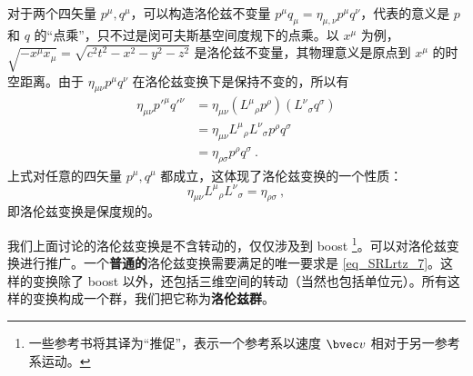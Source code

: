 对于两个四矢量 $p^\mu,q^\mu$，可以构造洛伦兹不变量 $p^\mu q_\mu=\eta_{\mu,\nu}p^\mu q^\nu$，代表的意义是 $p$ 和 $q$ 的“点乘”，只不过是闵可夫斯基空间度规下的点乘。以 $x^\mu$ 为例，$\sqrt{-x^\mu x_\mu}=\sqrt{c^2t^2-x^2-y^2-z^2}$ 是洛伦兹不变量，其物理意义是原点到 $x^\mu$ 的时空距离。由于 $\eta_{\mu\nu}p^\mu q^\nu$ 在洛伦兹变换下是保持不变的，所以有
\begin{equation}
\begin{aligned}
\eta_{\mu\nu}p'^\mu q'^\nu&=\eta_{\mu\nu}({L^\mu}_\rho p^\rho) ({L^\nu}_\sigma q^\sigma)\\
&=\eta_{\mu\nu}{L^\mu}_\rho {L^\nu}_\sigma p^\rho q^\sigma
\\
&=\eta_{\rho\sigma} p^\rho q^\sigma~.
\end{aligned}
\end{equation}
上式对任意的四矢量 $p^\mu,q^\mu$ 都成立，这体现了洛伦兹变换的一个性质：
\begin{equation}\label{eq_SRLrtz_7}
\eta_{\mu\nu}{L^\mu}_\rho {L^\nu}_\sigma=\eta_{\rho\sigma}~,
\end{equation}
即洛伦兹变换是保度规的。

我们上面讨论的洛伦兹变换是不含转动的，仅仅涉及到 boost \footnote{一些参考书将其译为“推促”，表示一个参考系以速度 $\bvec v$ 相对于另一参考系运动。}。可以对洛伦兹变换进行推广。一个\textbf{普通的}洛伦兹变换需要满足的唯一要求是 \autoref{eq_SRLrtz_7}。这样的变换除了 boost 以外，还包括三维空间的转动（当然也包括单位元）。所有这样的变换构成一个群，我们把它称为\textbf{洛伦兹群}。
